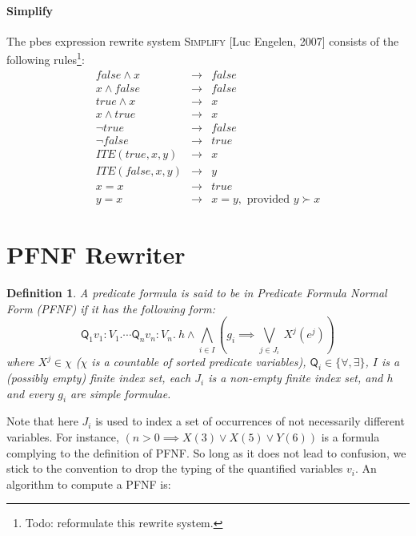 \documentclass{article}
\newtheorem{definition}[theorem]{Definition}
\begin{document}
\newpage
\paragraph{Simplify}

The pbes expression rewrite system \textsc{Simplify} [Luc Engelen, 2007]
consists of the following rules\footnote{%
Todo: reformulate this rewrite system.}:%
\begin{eqnarray*}
false\wedge x &\rightarrow &false \\
x\wedge false &\rightarrow &false \\
true\wedge x &\rightarrow &x \\
x\wedge true &\rightarrow &x \\
\lnot true &\rightarrow &false \\
\lnot false &\rightarrow &true \\
ITE(true,x,y) &\rightarrow &x \\
ITE(false,x,y) &\rightarrow &y \\
x=x &\rightarrow &true \\
y=x &\rightarrow &x=y,\text{ provided }y\succ x
\end{eqnarray*}

\newpage
\section{PFNF Rewriter}

\begin{definition}
A predicate formula is said to be in \emph{Predicate Formula Normal Form}
(PFNF) if it has the following form:
\begin{equation*}
\mathsf{Q}_{1}v_{1}{:}V_{1}.\cdots \mathsf{Q}_{n}v_{n}{:}V_{n}.~h\wedge
\bigwedge\limits_{i\in I}\left( g_{i}\implies \bigvee\limits_{j\in
J_{i}}~X^{j}(e^{j})\right)
\end{equation*}%
where $X^{j}\in \chi $ ($\chi $ is a countable of sorted predicate
variables), $\mathsf{Q}_{i}\in \{\forall ,\exists \}$, $I$ is a (possibly
empty) finite index set, each $J_{i}$ is a non-empty finite index set, and $%
h $ and every $g_{i}$ are simple formulae.
\end{definition}

Note that here $J_{i}$ is used to index a set of occurrences of not
necessarily different variables. For instance, $(n>0\implies X(3)\vee
X(5)\vee Y(6))$ is a formula complying to the definition of PFNF. So long as
it does not lead to confusion, we stick to the convention to drop the typing
of the quantified variables $v_{i}$. An algorithm to compute a PFNF is:
\end{document}
